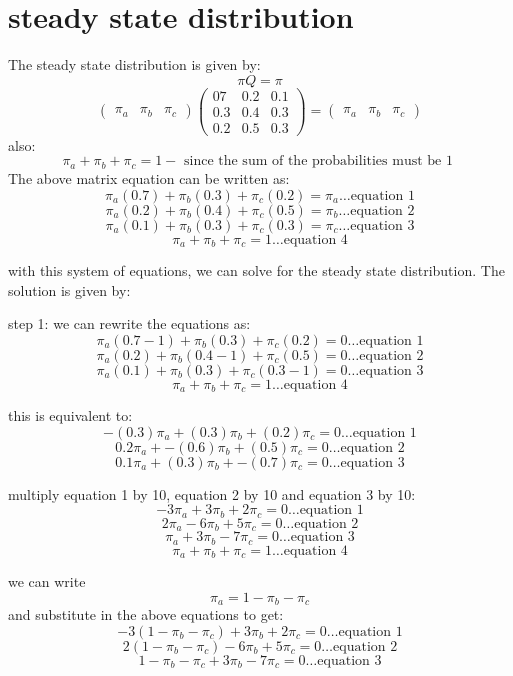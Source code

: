 \documentclass{article}
\begin{document}
\section{steady state distribution}
The steady state distribution is given by:
\[\pi Q= \pi\]
\[\begin{pmatrix}
\pi_a & \pi_b & \pi_c
\end{pmatrix}\begin{pmatrix}07 & 0.2 & 0.1 \\ 0.3 & 0.4 & 0.3 \\ 0.2 & 0.5 & 0.3\end{pmatrix} = \begin{pmatrix} \pi_a & \pi_b & \pi_c \end{pmatrix}\]
also:
\[\pi_a + \pi_b + \pi_c = 1 -\text{ since the sum of the probabilities must be 1 }\]
The  above matrix equation can be written as:
\[\pi_a(0.7) + \pi_b(0.3) + \pi_c(0.2) = \pi_a \ldots \text{equation 1}\]
\[\pi_a(0.2) + \pi_b(0.4) + \pi_c(0.5) = \pi_b \ldots\text{equation 2}\]
\[\pi_a(0.1) + \pi_b(0.3) + \pi_c(0.3) = \pi_c \ldots\text{equation 3}\]
\[\pi_a + \pi_b + \pi_c = 1 \ldots\text{equation 4}\]

with this system of equations, we can solve for the steady state distribution. The solution is given by:

step 1: we can rewrite the equations as:
\[\pi_a(0.7 - 1) + \pi_b(0.3) + \pi_c(0.2) = 0 \ldots\text{equation 1}\]
\[\pi_a(0.2) + \pi_b(0.4 - 1) + \pi_c(0.5) = 0 \ldots\text{equation 2}\]
\[\pi_a(0.1) + \pi_b(0.3) + \pi_c(0.3 - 1) = 0 \ldots\text{equation 3}\]
\[\pi_a + \pi_b + \pi_c = 1 \ldots\text{equation 4}\]

this is equivalent to:
\[-(0.3)\pi_a + (0.3)\pi_b + (0.2)\pi_c = 0 \ldots\text{equation 1}\]
\[0.2\pi_a + -(0.6)\pi_b + (0.5)\pi_c = 0 \ldots\text{equation 2}\]
\[0.1\pi_a + (0.3)\pi_b + -(0.7)\pi_c = 0 \ldots\text{equation 3}\]

multiply equation 1 by 10, equation 2 by 10 and equation 3 by 10:
\[-3\pi_a + 3\pi_b + 2\pi_c = 0 \ldots\text{equation 1}\]
\[2\pi_a - 6\pi_b + 5\pi_c = 0 \ldots\text{equation 2}\]
\[\pi_a + 3\pi_b - 7\pi_c = 0 \ldots\text{equation 3}\]
\[\pi_a + \pi_b + \pi_c = 1 \ldots\text{equation 4}\]

we can write \[\pi_a = 1 - \pi_b - \pi_c\] and substitute in the above equations to get:
\[-3(1 - \pi_b - \pi_c) + 3\pi_b + 2\pi_c = 0 \ldots\text{equation 1}\]
\[2(1 - \pi_b - \pi_c) - 6\pi_b + 5\pi_c = 0 \ldots\text{equation 2}\]
\[1 - \pi_b - \pi_c + 3\pi_b - 7\pi_c = 0 \ldots\text{equation 3}\]
\end{document}
